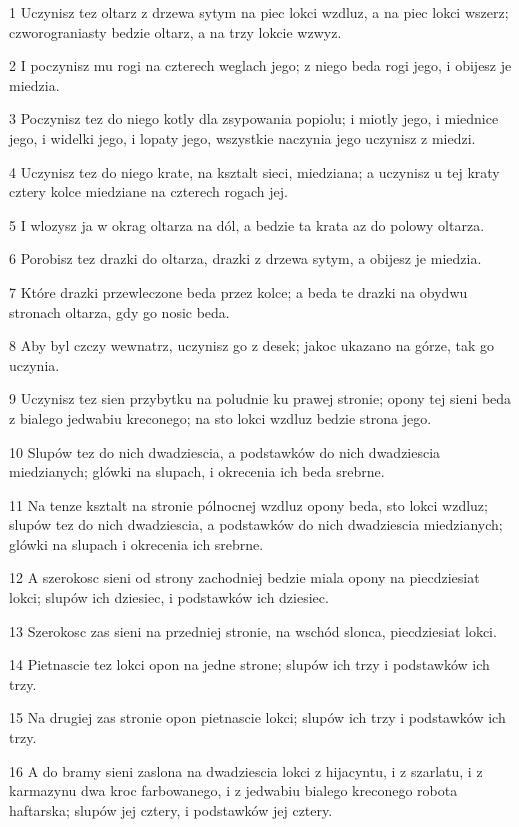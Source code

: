 \par 1 Uczynisz tez oltarz z drzewa sytym na piec lokci wzdluz, a na piec lokci wszerz; czworograniasty bedzie oltarz, a na trzy lokcie wzwyz.
\par 2 I poczynisz mu rogi na czterech weglach jego; z niego beda rogi jego, i obijesz je miedzia.
\par 3 Poczynisz tez do niego kotly dla zsypowania popiolu; i miotly jego, i miednice jego, i widelki jego, i lopaty jego, wszystkie naczynia jego uczynisz z miedzi.
\par 4 Uczynisz tez do niego krate, na ksztalt sieci, miedziana; a uczynisz u tej kraty cztery kolce miedziane na czterech rogach jej.
\par 5 I wlozysz ja w okrag oltarza na dól, a bedzie ta krata az do polowy oltarza.
\par 6 Porobisz tez drazki do oltarza, drazki z drzewa sytym, a obijesz je miedzia.
\par 7 Które drazki przewleczone beda przez kolce; a beda te drazki na obydwu stronach oltarza, gdy go nosic beda.
\par 8 Aby byl czczy wewnatrz, uczynisz go z desek; jakoc ukazano na górze, tak go uczynia.
\par 9 Uczynisz tez sien przybytku na poludnie ku prawej stronie; opony tej sieni beda z bialego jedwabiu kreconego; na sto lokci wzdluz bedzie strona jego.
\par 10 Slupów tez do nich dwadziescia, a podstawków do nich dwadziescia miedzianych; glówki na slupach, i okrecenia ich beda srebrne.
\par 11 Na tenze ksztalt na stronie pólnocnej wzdluz opony beda, sto lokci wzdluz; slupów tez do nich dwadziescia, a podstawków do nich dwadziescia miedzianych; glówki na slupach i okrecenia ich srebrne.
\par 12 A szerokosc sieni od strony zachodniej bedzie miala opony na piecdziesiat lokci; slupów ich dziesiec, i podstawków ich dziesiec.
\par 13 Szerokosc zas sieni na przedniej stronie, na wschód slonca, piecdziesiat lokci.
\par 14 Pietnascie tez lokci opon na jedne strone; slupów ich trzy i podstawków ich trzy.
\par 15 Na drugiej zas stronie opon pietnascie lokci; slupów ich trzy i podstawków ich trzy.
\par 16 A do bramy sieni zaslona na dwadziescia lokci z hijacyntu, i z szarlatu, i z karmazynu dwa kroc farbowanego, i z jedwabiu bialego kreconego robota haftarska; slupów jej cztery, i podstawków jej cztery.

